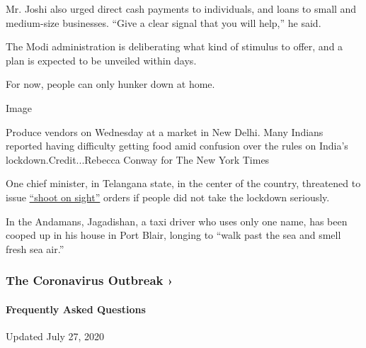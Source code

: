 Mr. Joshi also urged direct cash payments to individuals, and loans to
small and medium-size businesses. ``Give a clear signal that you will
help,'' he said.

The Modi administration is deliberating what kind of stimulus to offer,
and a plan is expected to be unveiled within days.

For now, people can only hunker down at home.

Image

Produce vendors on Wednesday at a market in New Delhi. Many Indians
reported having difficulty getting food amid confusion over the rules on
India's lockdown.Credit...Rebecca Conway for The New York Times

One chief minister, in Telangana state, in the center of the country,
threatened to issue
\href{https://www.deccanherald.com/national/south/coronavirus-lockdown-telangana-cm-announces-night-curfew-from-7-pm-to-6-am-817282.html}{``shoot
on sight''} orders if people did not take the lockdown seriously.

In the Andamans, Jagadishan, a taxi driver who uses only one name, has
been cooped up in his house in Port Blair, longing to ``walk past the
sea and smell fresh sea air.''

\href{https://www.nytimes.com/news-event/coronavirus?action=click\&pgtype=Article\&state=default\&region=MAIN_CONTENT_3\&context=storylines_faq}{}

\hypertarget{the-coronavirus-outbreak-}{%
\subsubsection{The Coronavirus Outbreak
›}\label{the-coronavirus-outbreak-}}

\hypertarget{frequently-asked-questions}{%
\paragraph{Frequently Asked
Questions}\label{frequently-asked-questions}}

Updated July 27, 2020

